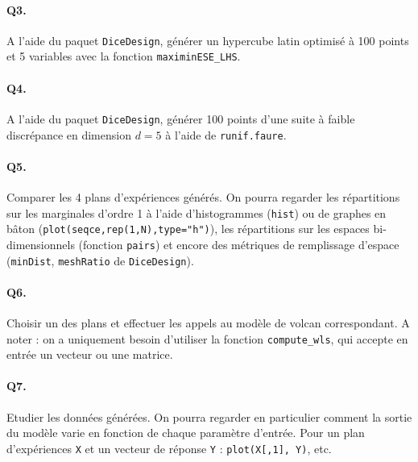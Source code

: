 \documentclass[12pt]{scrartcl}
\begin{document}
\paragraph{Q3.} A l'aide du paquet \texttt{DiceDesign}, générer un hypercube latin optimisé à 100 points et 5 variables avec la fonction \texttt{maximinESE\_LHS}.

\paragraph{Q4.} A l'aide du paquet \texttt{DiceDesign}, générer 100 points d'une suite à faible discrépance en dimension $d=5$ à l'aide de \texttt{runif.faure}.

\paragraph{Q5.} Comparer les 4 plans d'expériences générés. 
On pourra regarder les répartitions sur les marginales d'ordre 1 à l'aide d'histogrammes (\texttt{hist}) ou de graphes en bâton (\texttt{plot(seqce,rep(1,N),type="h")}), 
les répartitions sur les espaces bi-dimensionnels (fonction \texttt{pairs}) et encore des métriques de remplissage d'espace (\texttt{minDist}, \texttt{meshRatio} de \texttt{DiceDesign}).

\paragraph{Q6.} Choisir un des plans et effectuer les appels au modèle de volcan correspondant. A noter : on a uniquement besoin d'utiliser la fonction \texttt{compute\_wls}, qui accepte en entrée un vecteur ou une matrice.

\paragraph{Q7.} Etudier les données générées. On pourra regarder en particulier comment la sortie du modèle varie en fonction de chaque paramètre d'entrée. 
Pour un plan d'expériences \texttt{X} et un vecteur de réponse \texttt{Y} :
\texttt{plot(X[,1], Y)}, etc.
\end{document}
